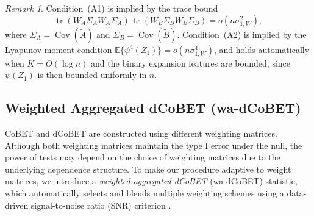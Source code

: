 \documentclass[12pt,reqno,oneside]{amsbook}
\theoremstyle{definition}
\theoremstyle{remark}
\newtheorem{remark}{Remark}
\begin{document}
\begin{remark}
Condition~\textup{(A1)} is implied by the trace bound
\[
  \operatorname{tr}(W_A\Sigma_AW_A\Sigma_A)\,
  \operatorname{tr}(W_B\Sigma_BW_B\Sigma_B)
  = o(n\sigma_{1,W}^2),
\]
where $\Sigma_A=\operatorname{Cov}(\tilde A)$ and
$\Sigma_B=\operatorname{Cov}(\tilde B)$.
Condition~\textup{(A2)} is implied by the Lyapunov moment condition
$\mathbb E\{\psi^4(Z_1)\}=o(n\sigma_{1,W}^4)$,
and holds automatically when $K=O(\log n)$ and the binary expansion
features are bounded, since $\psi(Z_1)$ is then bounded uniformly in $n$.
\end{remark}




\subsection{Weighted Aggregated dCoBET (wa-dCoBET)}
\label{subsec:wa-dcobet}

CoBET and dCoBET are constructed using different weighting matrices. Although both weighting matrices maintain the type I error under the null,  
the power of tests may depend on the choice of weighting matrices
due to the underlying dependence structure. To make our procedure adaptive to weight matrices, we introduce a \emph{weighted aggregated
dCoBET} (wa-dCoBET) statistic, which automatically selects and blends multiple weighting schemes using a data-driven signal-to-noise ratio (SNR) criterion \cite{HeZhongCuiMandrekar2023}.
\end{document}
